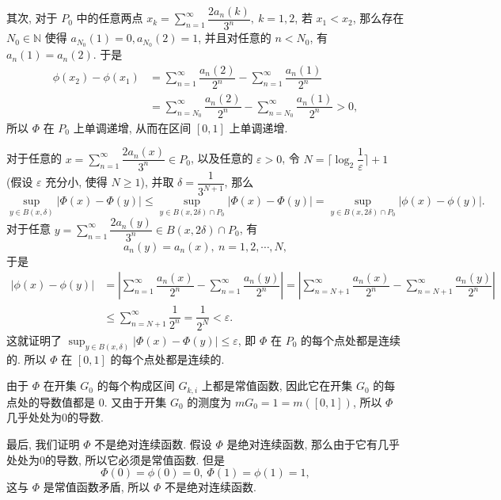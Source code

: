 \begin{solution}
\begin{enumerate}
    其次, 对于 \(P_0\) 中的任意两点 \(x_k = \displaystyle \sum\limits_{n=1}^{\infty} \dfrac{2a_n(k)}{3^n}, ~ k = 1, 2\), 若 \(x_1 < x_2\), 那么存在 \(N_0 \in \mathbb{N}\) 使得 \(a_{N_0}(1) = 0, a_{N_0}(2) = 1\), 并且对任意的 \(n < N_0\), 有 \(a_n(1) = a_n(2)\). 于是
    \[\begin{aligned}
    \phi(x_2) - \phi(x_1) & = \sum\limits_{n=1}^{\infty} \dfrac{a_n(2)}{2^n} - \sum\limits_{n=1}^{\infty} \dfrac{a_n(1)}{2^n} \\
    & = \sum\limits_{n=N_0}^{\infty} \dfrac{a_n(2)}{2^n} - \sum\limits_{n=N_0}^{\infty} \dfrac{a_n(1)}{2^n} > 0,
    \end{aligned}\]
    所以 \(\Phi\) 在 \(P_0\) 上单调递增, 从而在区间 \([0, 1]\) 上单调递增.

    对于任意的 \(\displaystyle x = \sum\limits_{n=1}^{\infty} \dfrac{2a_n(x)}{3^n} \in P_0\), 以及任意的 \(\varepsilon > 0\), 令 \(N = \lceil \log_2 \dfrac{1}{\varepsilon} \rceil + 1\) (假设 \(\varepsilon\) 充分小, 使得 \(N \geqslant 1\)), 并取 \(\delta = \dfrac{1}{3^{N+1}}\), 那么
    \[\sup_{y \in B(x, \delta)} \lvert \Phi(x) - \Phi(y) \rvert \leqslant \sup_{y \in B(x, 2\delta) \cap P_0} \lvert \Phi(x) - \Phi(y) \rvert = \sup_{y \in B(x, 2\delta) \cap P_0} \lvert \phi(x) - \phi(y) \rvert.\]
    对于任意 \(\displaystyle y = \sum\limits_{n=1}^{\infty} \dfrac{2a_n(y)}{3^n} \in B(x, 2\delta) \cap P_0\), 有
    \[a_n(y) = a_n(x), ~ n = 1, 2, \cdots, N,\]
    于是
    \[\begin{aligned}
    \lvert \phi(x) - \phi(y) \rvert & = \left\lvert \sum\limits_{n=1}^{\infty} \dfrac{a_n(x)}{2^n} - \sum\limits_{n=1}^{\infty} \dfrac{a_n(y)}{2^n} \right\rvert = \left\lvert \sum\limits_{n=N+1}^{\infty} \dfrac{a_n(x)}{2^n} - \sum\limits_{n=N+1}^{\infty} \dfrac{a_n(y)}{2^n} \right\rvert \\
    & \leqslant \sum\limits_{n=N+1}^{\infty} \dfrac{1}{2^n} = \dfrac{1}{2^{N}} < \varepsilon.
    \end{aligned}\]
    这就证明了 \(\displaystyle \sup_{y \in B(x, \delta)} \lvert \Phi(x) - \Phi(y) \rvert \leqslant \varepsilon\), 即 \(\Phi\) 在 \(P_0\) 的每个点处都是连续的. 所以 \(\Phi\) 在 \([0, 1]\) 的每个点处都是连续的.

    由于 \(\Phi\) 在开集 \(G_0\) 的每个构成区间 \(G_{k, i}\) 上都是常值函数, 因此它在开集 \(G_0\) 的每点处的导数值都是 \(0\). 又由于开集 \(G_0\) 的测度为 \(m G_0 = 1 = m ([0, 1])\), 所以 \(\Phi\) 几乎处处为0的导数.

    最后, 我们证明 \(\Phi\) 不是绝对连续函数. 假设 \(\Phi\) 是绝对连续函数, 那么由于它有几乎处处为0的导数, 所以它必须是常值函数. 但是
    \[\Phi(0) = \phi(0) = 0, ~ \Phi(1) = \phi(1) = 1,\]
    这与 \(\Phi\) 是常值函数矛盾, 所以 \(\Phi\) 不是绝对连续函数.


\end{enumerate}
\end{solution}
